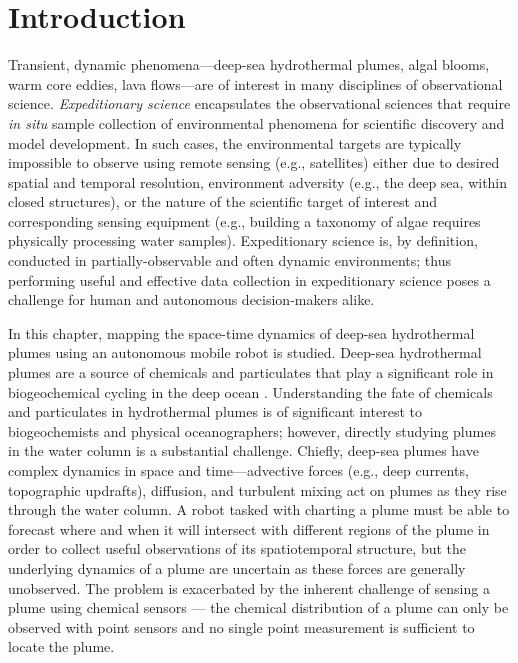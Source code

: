 \section{Introduction}
Transient, dynamic phenomena---deep-sea hydrothermal plumes, algal blooms, warm core eddies, lava flows---are of interest in many disciplines of observational science. \emph{Expeditionary science} encapsulates the observational sciences that require \emph{in situ} sample collection of environmental phenomena for scientific discovery and model development. In such cases, the environmental targets are typically impossible to observe using remote sensing (e.g., satellites) either due to desired spatial and temporal resolution, environment adversity (e.g., the deep sea, within closed structures), or the nature of the scientific target of interest and corresponding sensing equipment (e.g., building a taxonomy of algae requires physically processing water samples). Expeditionary science is, by definition, conducted in partially-observable and often dynamic environments; thus performing useful and effective data collection in expeditionary science poses a challenge for human and autonomous decision-makers alike.

In this chapter, mapping the space-time dynamics of deep-sea hydrothermal plumes using an autonomous mobile robot is studied. Deep-sea hydrothermal plumes are a source of chemicals and particulates that play a significant role in biogeochemical cycling in the deep ocean \autocite{le2019hydrothermal,resing2015basin,dick2013microbiology, vic2018dispersion, scholz2019shelf}. Understanding the fate of chemicals and particulates in hydrothermal plumes is of significant interest to biogeochemists and physical oceanographers; however, directly studying plumes in the water column is a substantial challenge. Chiefly, deep-sea plumes have complex dynamics in space and time---advective forces (e.g., deep currents, topographic updrafts), diffusion, and turbulent mixing act on plumes as they rise through the water column. A robot tasked with charting a plume must be able to forecast where and when it will intersect with different regions of the plume in order to collect useful observations of its spatiotemporal structure, but the underlying dynamics of a plume are uncertain as these forces are generally unobserved. The problem is exacerbated by the inherent challenge of sensing a plume using chemical sensors --- the chemical distribution of a plume can only be observed with point sensors and no single point measurement is sufficient to locate the plume.

